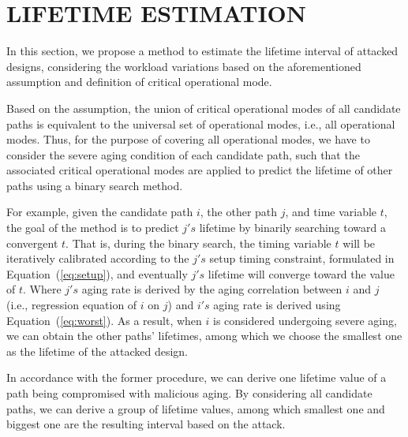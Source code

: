 
\section{LIFETIME ESTIMATION}
\label{sec:lt_estimation}
In this section, we propose a method to estimate the lifetime interval of attacked designs, considering the workload variations based on the aforementioned assumption and definition of critical operational mode.

Based on the assumption, the union of critical operational modes of all candidate paths is equivalent to the universal set of operational modes, i.e., all operational modes. Thus, for the purpose of covering all operational modes, we have to consider the severe aging condition of each candidate path, such that the associated critical operational modes are applied to predict the lifetime of other paths using a binary search method.

For example, given the candidate path $i$, the other path $j$, and time variable $t$, the goal of the method is to predict $j's$ lifetime by binarily searching toward a convergent $t$. That is, during the binary search, the timing variable $t$ will be iteratively calibrated according to the $j's$ setup timing constraint, formulated in Equation~(\ref{eq:setup}), and eventually $j's$ lifetime will converge toward the value of $t$. Where $j's$ aging rate is derived by the aging correlation between $i$ and $j$ (i.e., regression equation of $i$ on $j$) and $i's$ aging rate is derived using Equation~(\ref{eq:worst}). 
As a result, when $i$ is considered undergoing severe aging, we can obtain the other paths' lifetimes, among which we choose the smallest one as the lifetime of the attacked design.

In accordance with the former procedure, we can derive one lifetime value of a path being compromised with malicious aging. By considering all candidate paths, we can derive a group of lifetime values, among which smallest one and biggest one are the resulting interval based on the attack.


  
